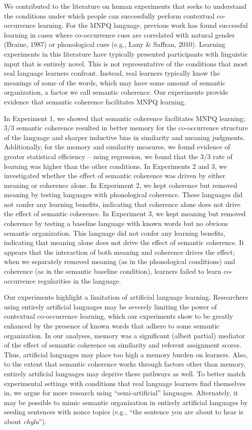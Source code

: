 \documentclass[man,floatsintext]{apa6}
\begin{document}
We contributed to the literature on human experiments that seeks to understand the conditions under which people can successfully perform contextual co-occurrence learning. For the MNPQ language, previous work has found successful learning in cases where co-occurrence cues are correlated with natural gender (Braine, 1987) or phonological cues (e.g., Lany \& Saffran, 2010). Learning experiments in this literature have typically presented participants with linguistic input that is entirely novel. This is not representative of the conditions that most real language learners confront. Instead, real learners typically know the meanings of some of the words, which may have some amount of semantic organization, a factor we call semantic coherence. Our experiments provide evidence that semantic coherence facilitates MNPQ learning.

In Experiment 1, we showed that semantic coherence facilitates MNPQ learning; 3/3 semantic coherence resulted in better memory for the co-occurrence structure of the language and sharper inductive bias in similarity and meaning judgments. Additionally, for the memory and similarity measures, we found evidence of greater statistical efficiency -- using regression, we found that the 3/3 rate of learning was higher than the other conditions. In Experiments 2 and 3, we investigated whether the effect of semantic coherence was driven by either meaning or coherence alone. In Experiment 2, we kept coherence but removed meaning by testing languages with phonological coherence. These languages did not confer any learning benefits, indicating that coherence alone does not drive the effect of semantic coherence. In Experiment 3, we kept meaning but removed coherence by testing a baseline language with known words but no obvious semantic organization. This language did not confer any learning benefits, indicating that meaning alone does not drive the effect of semantic coherence. It appears that the interaction of both meaning and coherence drives the effect; when we separately removed meaning (as in the phonological conditions) and coherence (as in the semantic baseline condition), learners failed to learn co-occurrence regularities in the language.

Our experiments highlight a limitation of artificial language learning. Researchers using entirely artificial languages may be severely limiting the power of contextual co-occurrence learning, which our experiments show to be greatly enhanced by the presence of known words that adhere to some semantic organization. In our analyses, memory was a significant (albeit partial) mediator of the effect of semantic coherence on similarity and referent assignment scores. Thus, artificial languages may place too high a memory burden on learners. Also, to the extent that semantic coherence works through factors other than memory, entirely artificial languages may deprive these pathways as well. To better match experimental settings with conditions that real language learners find themselves in, we argue for more research using ``semi-artificial'' languages. Alternately, it may be possible to mimic semantic organization in entirely artificial languages by seeding sentences with nonce topics (e.g., ``the sentence you are about to hear is about \emph{chylu}'').
\end{document}
